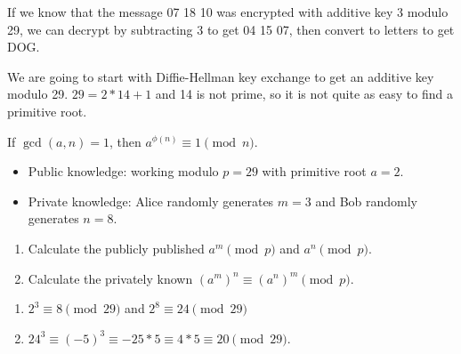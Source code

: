 \documentclass[letterpaper, 11 pt]{article}
\begin{document}
If we know that the message 07 18 10 was encrypted with additive key 3 modulo 29, we can decrypt by subtracting 3 to get 04 15 07, then convert to letters to get DOG.

We are going to start with Diffie-Hellman key exchange to get an additive key modulo 29. $29=2*14+1$ and 14 is not prime, so it is not quite as easy to find a primitive root. 

\begin{thm}
 If $\gcd(a,n)=1$, then $a^{\phi(n)}\equiv 1 \pmod n.$
\end{thm}



\begin{example}
\begin{itemize}
 \item  Public knowledge: working modulo $p=29$ with primitive root $a=2$.
\item Private knowledge: Alice randomly generates $m=3$ and Bob randomly generates $n=8$.
\end{itemize}
\begin{enumerate}
 \item Calculate the publicly published $a^m\pmod p$ and $a^n\pmod p$.
 \item Calculate the privately known $(a^m)^n\equiv (a^n)^m \pmod p$.
\end{enumerate}
\end{example}
\begin{solution}
 
\begin{enumerate}
 \item $2^{3} \equiv 8\pmod 29$ and $2^8 \equiv 24\pmod 29$
 \item $24^3\equiv (-5)^3\equiv -25*5\equiv 4*5\equiv 20 \pmod 29$.
\end{enumerate}
\end{solution}
\end{document}
